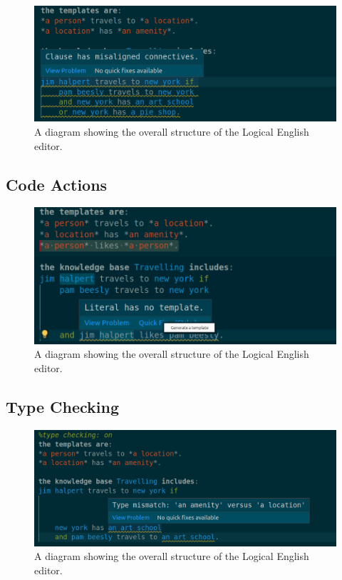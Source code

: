 \documentclass[../main.tex]{subfiles}
\begin{document}
\begin{figure}[h!]
\centering
\includegraphics[width = \linewidth]{./figures/misaligned-connectives.png}
\caption{A diagram showing the overall structure of the Logical English editor.}
\label{fig:system-overview}
\end{figure}

\subsection{Code Actions}
\begin{figure}[h!]
\centering
\includegraphics[width = \linewidth]{./figures/generate-template-full.png}
\caption{A diagram showing the overall structure of the Logical English editor.}
\label{fig:system-overview}
\end{figure}

\subsection{Type Checking}
\begin{figure}[h!]
\centering
\includegraphics[width = \linewidth]{./figures/type-error.png}
\caption{A diagram showing the overall structure of the Logical English editor.}
\label{fig:system-overview}
\end{figure}
\end{document}
